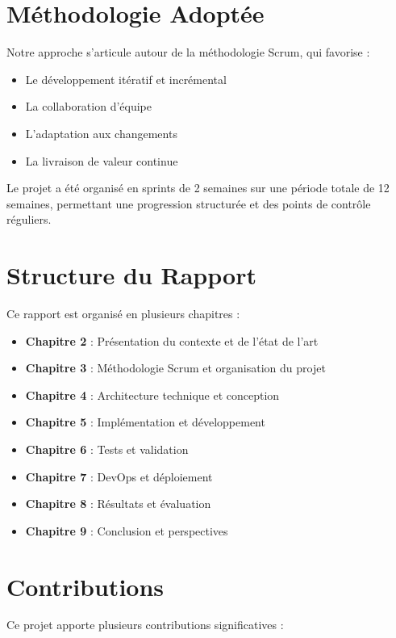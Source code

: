 \section{Méthodologie Adoptée}

Notre approche s'articule autour de la méthodologie Scrum, qui favorise :
\begin{itemize}
    \item Le développement itératif et incrémental
    \item La collaboration d'équipe
    \item L'adaptation aux changements
    \item La livraison de valeur continue
\end{itemize}

Le projet a été organisé en sprints de 2 semaines sur une période totale de 12 semaines, permettant une progression structurée et des points de contrôle réguliers.

\section{Structure du Rapport}

Ce rapport est organisé en plusieurs chapitres :

\begin{itemize}
    \item \textbf{Chapitre 2} : Présentation du contexte et de l'état de l'art
    \item \textbf{Chapitre 3} : Méthodologie Scrum et organisation du projet
    \item \textbf{Chapitre 4} : Architecture technique et conception
    \item \textbf{Chapitre 5} : Implémentation et développement
    \item \textbf{Chapitre 6} : Tests et validation
    \item \textbf{Chapitre 7} : DevOps et déploiement
    \item \textbf{Chapitre 8} : Résultats et évaluation
    \item \textbf{Chapitre 9} : Conclusion et perspectives
\end{itemize}

\section{Contributions}

Ce projet apporte plusieurs contributions significatives :

